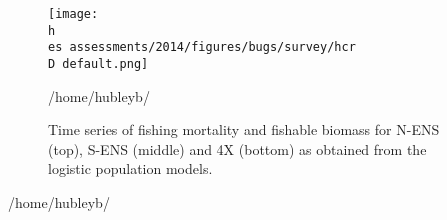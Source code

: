 \documentclass[11pt]{article}
\newcommand{\D}{.}
\newcommand{\h}{/home/hubleyb/}
\newcommand{\es}{bio.data/bio.snowcrab/}
\begin{document}
\begin{figure}
\centering
\texttt{[image: \\h \\es assessments/2014/figures/bugs/survey/hcr\\D default.png]}\\ 
\caption{Time series of fishing mortality and fishable biomass for N-ENS (top), S-ENS (middle) and 4X (bottom) as obtained from the logistic population models.}
\h \end{figure}
\clearpage
%
%
%


\h 
\end{document}
